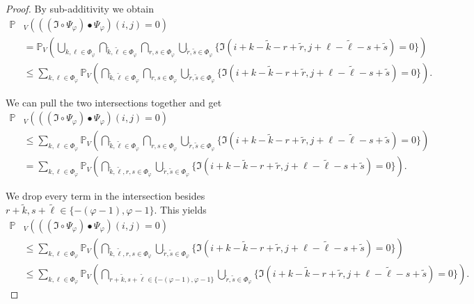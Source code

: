 \documentclass[a4paper,12pt]{article}
\theoremstyle{plain}
\theoremstyle{definition}
\begin{document}
\begin{appendix}
\begin{proof}
		By sub-additivity we obtain
		\begin{align*}
			\mathbb{P}&_V\left( ((\mathfrak{I} \circ \Psi_\varphi) \bullet \Psi_\varphi)(i, j) = 0 \right) \\
			&= \mathbb{P}_V\left( \bigcup_{k, \ell \in \Phi_\varphi} \bigcap_{\tilde{k}, \tilde{\ell} \in \Phi_\varphi} \bigcap_{r, s \in \Phi_\varphi} \bigcup_{\tilde{r}, \tilde{s} \in \Phi_\varphi} \{ \mathfrak{I}(i + k - \tilde{k} - r + \tilde{r}, j + \ell - \tilde{\ell} - s + \tilde{s}) = 0 \} \right) \\
			&\leq \sum_{k, \ell \in \Phi_\varphi} \mathbb{P}_V\left( \bigcap_{\tilde{k}, \tilde{\ell} \in \Phi_\varphi} \bigcap_{r, s \in \Phi_\varphi} \bigcup_{\tilde{r}, \tilde{s} \in \Phi_\varphi} \{ \mathfrak{I}(i + k - \tilde{k} - r + \tilde{r}, j + \ell - \tilde{\ell} - s + \tilde{s}) = 0 \} \right).
		\end{align*}
		
		We can pull the two intersections together and get
		\begin{align*}
			\mathbb{P}&_V\left( ((\mathfrak{I} \circ \Psi_\varphi) \bullet \Psi_\varphi)(i, j) = 0 \right) \\
			&\leq \sum_{k, \ell \in \Phi_\varphi} \mathbb{P}_V\left( \bigcap_{\tilde{k}, \tilde{\ell} \in \Phi_\varphi} \bigcap_{r, s \in \Phi_\varphi} \bigcup_{\tilde{r}, \tilde{s} \in \Phi_\varphi} \{ \mathfrak{I}(i + k - \tilde{k} - r + \tilde{r}, j + \ell - \tilde{\ell} - s + \tilde{s}) = 0 \} \right) \\
			&= \sum_{k, \ell \in \Phi_\varphi} \mathbb{P}_V\left( \bigcap_{\tilde{k}, \tilde{\ell}, r, s \in \Phi_\varphi} \bigcup_{\tilde{r}, \tilde{s} \in \Phi_\varphi} \{ \mathfrak{I}(i + k - \tilde{k} - r + \tilde{r}, j + \ell - \tilde{\ell} - s + \tilde{s}) = 0 \} \right).
		\end{align*}
		
		We drop every term in the intersection besides $r + \tilde{k}, s + \tilde{\ell} \in \{ - ( \varphi - 1 ), \varphi - 1 \}$. This yields
		\begin{align*}
			\mathbb{P}&_V\left( ((\mathfrak{I} \circ \Psi_\varphi) \bullet \Psi_\varphi)(i, j) = 0 \right) \\
			&\leq \sum_{k, \ell \in \Phi_\varphi} \mathbb{P}_V\left( \bigcap_{\tilde{k}, \tilde{\ell}, r, s \in \Phi_\varphi} \bigcup_{\tilde{r}, \tilde{s} \in \Phi_\varphi} \{ \mathfrak{I}(i + k - \tilde{k} - r + \tilde{r}, j + \ell - \tilde{\ell} - s + \tilde{s}) = 0 \} \right) \\
			&\leq \sum_{k, \ell \in \Phi_\varphi} \mathbb{P}_V\left( \bigcap_{r + \tilde{k}, s + \tilde{\ell} \in \{ - ( \varphi - 1 ), \varphi - 1 \}} \bigcup_{\tilde{r}, \tilde{s} \in \Phi_\varphi} \{ \mathfrak{I}(i + k - \tilde{k} - r + \tilde{r}, j + \ell - \tilde{\ell} - s + \tilde{s}) = 0 \} \right).
		\end{align*}
		

\end{proof}
\end{appendix}
\end{document}
